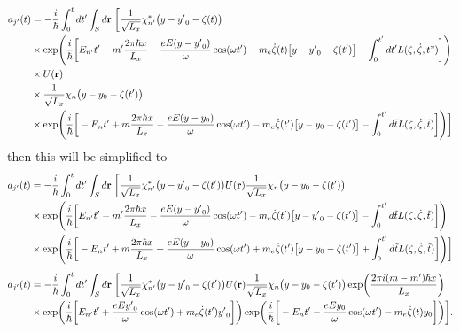 \begin{equation} \label{2.13}
  \begin{aligned}
    a_{j'}(t) & =
   -\frac{i}{\hbar}
   \int_0^t dt' \int_S d\vb{r} \;
   \bigg[
   \frac{1}{\sqrt{L_x}} \chi_{n'}^*\big(y - {y'}_0 -\zeta(t)\big) \\
   & \times
     \exp(
    \frac{i}{\hbar}\bigg[E_{n'}t' - m'\frac{2\pi \hbar x}{L_x} -
   \frac{eE(y-{y'}_0)}{\omega}\cos(\omega t')-
   m_e\dot{\zeta}(t)\big[y - {y'}_0 -\zeta(t')\big]
    - \int_0^{t'}dt'L(\zeta,\dot{\zeta},t")\bigg]) \\
    & \times
    U(\vb{r}) \\
    & \times
    \frac{1}{\sqrt{L_x}} \chi_{n}\big(y - y_0 -\zeta(t')\big) \\
    & \times
      \exp(
     \frac{i}{\hbar}\bigg[ - E_{n}t' + m\frac{2\pi \hbar x}{L_x} -
    \frac{eE(y-y_0)}{\omega}\cos(\omega t') -
    m_e\dot{\zeta}(t')\big[y - y_0 -\zeta(t')\big]
     - \int_0^{t'}d\tilde{t}L(\zeta,\dot{\zeta},\tilde{t})\bigg])
    \bigg]
  \end{aligned}
\end{equation}
then this will be simplified to
\begin{equation} \label{2.14}
  \begin{aligned}
    a_{j'}(t) & =
   -\frac{i}{\hbar}
   \int_0^t dt' \int_S d\vb{r} \;
   \bigg[
   \frac{1}{\sqrt{L_x}} \chi_{n'}^*\big(y - {y'}_0 -\zeta(t')\big)
   U(\vb{r})
   \frac{1}{\sqrt{L_x}} \chi_{n}\big(y - y_0 -\zeta(t')\big)  \\
   & \times
     \exp(
    \frac{i}{\hbar}\bigg[ E_{n'}t' - m'\frac{2\pi \hbar x}{L_x} -
   \frac{eE(y-{y'}_0)}{\omega}\cos(\omega t') -
   m_e\dot{\zeta}(t')\big[y - {y'}_0 -\zeta(t')\big]
    - \int_0^{t'}d\tilde{t}L(\zeta,\dot{\zeta},\tilde{t})\bigg]) \\
    & \times
      \exp(
     \frac{i}{\hbar}\bigg[ - E_{n}t' + m\frac{2\pi \hbar x}{L_x} +
    \frac{eE(y-y_0)}{\omega}\cos(\omega t') +
    m_e\dot{\zeta}(t')\big[y - y_0 -\zeta(t')\big]
     + \int_0^{t'}d\tilde{t}L(\zeta,\dot{\zeta},\tilde{t})\bigg])
    \bigg]
  \end{aligned}
\end{equation}
\begin{equation} \label{2.15}
  \begin{aligned}
    a_{j'}(t) & =
   -\frac{i}{\hbar}
   \int_0^t dt' \int_S d\vb{r} \;
   \bigg[
   \frac{1}{\sqrt{L_x}} \chi_{n'}^*\big(y - {y'}_0 -\zeta(t')\big)
   U(\vb{r})
   \frac{1}{\sqrt{L_x}} \chi_{n}\big(y - y_0 -\zeta(t')\big)
   \exp(\frac{2\pi i(m-m') \hbar x}{L_x})
   \\
   & \times
     \exp(
    \frac{i}{\hbar}\bigg[ E_{n'}t' +
   \frac{eE{y'}_0}{\omega}\cos(\omega t') +
   m_e\dot{\zeta}(t'){y'}_0
    \bigg])
      \exp(
     \frac{i}{\hbar}\bigg[ - E_{n}t' -
    \frac{eEy_0}{\omega}\cos(\omega t') -
    m_e\dot{\zeta}(t)y_0
    \bigg])
    \bigg].
  \end{aligned}
\end{equation}
